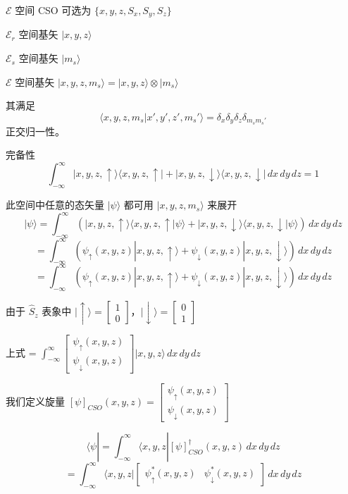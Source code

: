 \documentclass[lang=cn,10pt]{elegantbook}
\begin{document}
\begin{enumerate}
	$\mathcal{E}$ 空间 CSO 可选为 $\{x, y, z, S_x, S_y, S_z\}$
	
	$\mathcal{E}_r$ 空间基矢 $|x, y, z\rangle$
	
	$\mathcal{E}_s$ 空间基矢 $|m_s\rangle$
	
	$\mathcal{E}$ 空间基矢 $|x, y, z, m_s\rangle = |x, y, z\rangle \otimes |m_s\rangle$
	
	其满足
	\[
	\langle x, y, z, m_s | x', y', z', m_s' \rangle = \delta_x \delta_y \delta_z \delta_{m_s m_s'}
	\]
	正交归一性。
	
	完备性
	\[
	\int_{-\infty}^{\infty} |x, y, z, \uparrow\rangle \langle x, y, z, \uparrow| + |x, y, z, \downarrow\rangle \langle x, y, z, \downarrow| \, dx \, dy \, dz = 1
	\]
	
	此空间中任意的态矢量 $|\psi\rangle$ 都可用 $|x, y, z, m_s\rangle$ 来展开
	\[
	|\psi\rangle = \int_{-\infty}^{\infty} \left( |x, y, z, \uparrow\rangle \langle x, y, z, \uparrow | \psi \rangle + |x, y, z, \downarrow\rangle \langle x, y, z, \downarrow | \psi \rangle \right) \, dx \, dy \, dz
	\]
	\[
	= \int_{-\infty}^{\infty} \left( \psi_\uparrow(x, y, z) |x, y, z, \uparrow\rangle + \psi_\downarrow(x, y, z) |x, y, z, \downarrow\rangle \right) \, dx \, dy \, dz
	\]
	\[
	= \int_{-\infty}^{\infty} \left( \psi_\uparrow(x, y, z) |x, y, z, \uparrow\rangle + \psi_\downarrow(x, y, z) |x, y, z, \downarrow\rangle \right) \, dx \, dy \, dz
	\]
	
	由于 $\hat{S}_z$ 表象中 $|\uparrow\rangle = \begin{bmatrix} 1 \\ 0 \end{bmatrix}$，$|\downarrow\rangle = \begin{bmatrix} 0 \\ 1 \end{bmatrix}$
	
	上式 = $\int_{-\infty}^{\infty} \begin{bmatrix} \psi_\uparrow(x, y, z) \\ \psi_\downarrow(x, y, z) \end{bmatrix} |x, y, z\rangle \, dx \, dy \, dz$
	
	我们定义旋量 $[\psi]_{CSO}(x, y, z) = \begin{bmatrix} \psi_\uparrow(x, y, z) \\ \psi_\downarrow(x, y, z) \end{bmatrix}$
	
	\[
	\langle \psi | = \int_{-\infty}^{\infty} \langle x, y, z | [\psi]_{CSO}^\dagger(x, y, z) \, dx \, dy \, dz
	\]
	\[
	= \int_{-\infty}^{\infty} \langle x, y, z | \begin{bmatrix} \psi_\uparrow^*(x, y, z) & \psi_\downarrow^*(x, y, z) \end{bmatrix} \, dx \, dy \, dz
	\]
	

\end{enumerate}
\end{document}
